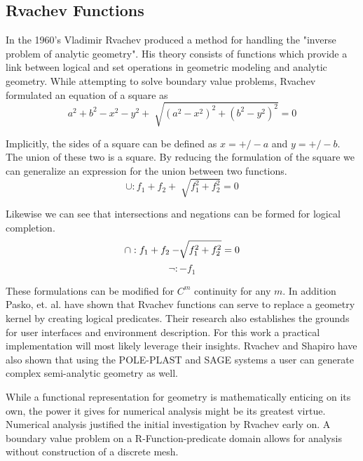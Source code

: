 \subsection{Rvachev Functions}

In the 1960's Vladimir Rvachev produced a method for handling the "inverse
problem of analytic geometry". His theory consists of functions which provide a
link between logical and set operations in geometric modeling and analytic
geometry.\cite{shapiro1991theory} While attempting to solve boundary value problems,
Rvachev formulated an equation of a square as
\begin{equation*}
a^2 + b^2 − x^2 − y^2 + \sqrt[]{( a^2 − x^2 )^2 +( b^2 − y^2 )^2} =0
\end{equation*}

Implicitly, the sides of a square can be defined as $x= +/- a$ and $y= +/- b$.
The union of these two is a square. By reducing the formulation of the square
we can generalize an expression for the union between two functions.
\begin{equation*}
\cup : f_1 + f_2 + \sqrt[]{f_1^2 +f_2^2} =0
\end{equation*}

Likewise we can see that intersections and negations can be formed for logical
completion.
\begin{equation*}
\cap : f_1 + f_2 - \sqrt[]{f_1^2 +f_2^2} =0 \\
\end{equation*}
\begin{equation*}
\neg : -f_1
\end{equation*}

These formulations can be modified for $C^m$ continuity for any $m$.
\cite{shapiro2007semi} In addition Pasko, et. al. have shown that Rvachev
functions can serve to replace a geometry kernel by creating logical
predicates. \cite{pasko1995function} Their research also establishes the
grounds for user interfaces and environment description. For this work a
practical implementation will most likely leverage their insights.
Rvachev and Shapiro have also shown that using the POLE-PLAST and SAGE
systems a user can generate complex semi-analytic geometry
as well.\cite{rvachev2000completeness} 

While a functional representation for geometry is mathematically enticing on
its own, the power it gives for numerical analysis might be its greatest
virtue. Numerical analysis justified the initial investigation by Rvachev
early on. A boundary value problem on a R-Function-predicate domain allows
for analysis without construction of a discrete mesh.\cite{rvachev2000completeness}


